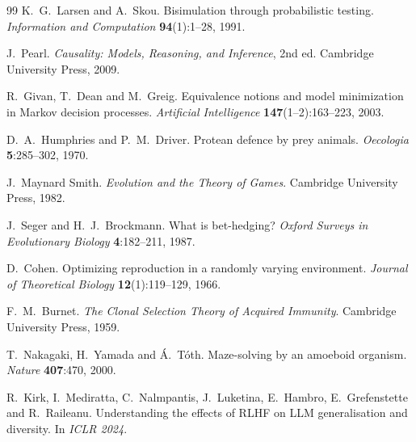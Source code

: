 \documentclass[11pt]{article}
\theoremstyle{plain}
\theoremstyle{definition}
\theoremstyle{remark}
\begin{document}
\begin{thebibliography}{99}
 K.~G.~Larsen and A.~Skou.
\newblock Bisimulation through probabilistic testing.
\newblock \emph{Information and Computation} \textbf{94}(1):1--28, 1991.

 J.~Pearl.
\newblock \emph{Causality: Models, Reasoning, and Inference}, 2nd ed.
\newblock Cambridge University Press, 2009.

 R.~Givan, T.~Dean and M.~Greig.
\newblock Equivalence notions and model minimization in Markov decision
processes.
\newblock \emph{Artificial Intelligence} \textbf{147}(1--2):163--223, 2003.

 D.~A.~Humphries and P.~M.~Driver.
\newblock Protean defence by prey animals.
\newblock \emph{Oecologia} \textbf{5}:285--302, 1970.

 J.~Maynard Smith.
\newblock \emph{Evolution and the Theory of Games}.
\newblock Cambridge University Press, 1982.

 J.~Seger and H.~J.~Brockmann.
\newblock What is bet-hedging?
\newblock \emph{Oxford Surveys in Evolutionary Biology} \textbf{4}:182--211, 1987.

 D.~Cohen.
\newblock Optimizing reproduction in a randomly varying environment.
\newblock \emph{Journal of Theoretical Biology} \textbf{12}(1):119--129, 1966.

 F.~M.~Burnet.
\newblock \emph{The Clonal Selection Theory of Acquired Immunity}.
\newblock Cambridge University Press, 1959.

 T.~Nakagaki, H.~Yamada and \'A.~T\'oth.
\newblock Maze-solving by an amoeboid organism.
\newblock \emph{Nature} \textbf{407}:470, 2000.

 R.~Kirk, I.~Mediratta, C.~Nalmpantis, J.~Luketina,
E.~Hambro, E.~Grefenstette and R.~Raileanu.
\newblock Understanding the effects of RLHF on LLM generalisation and
diversity.
\newblock In \emph{ICLR 2024}.

\end{thebibliography}
\end{document}
